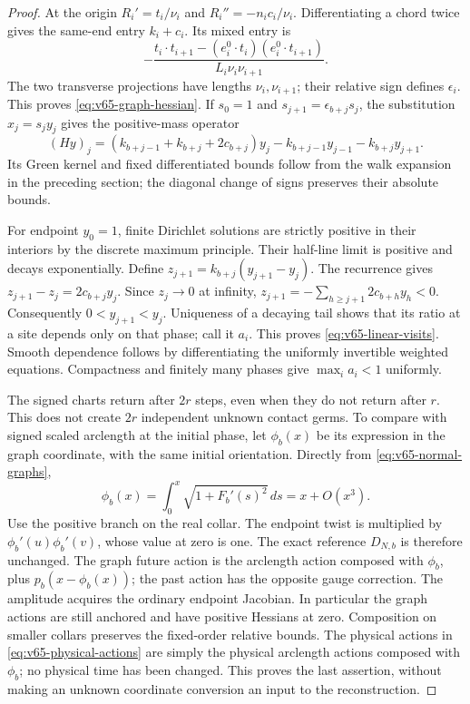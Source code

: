 \begin{proof}
At the origin $R_i'=t_i/\nu_i$ and $R_i''=-n_i c_i/\nu_i$.
Differentiating a chord twice gives the same-end entry $k_i+c_i$.
Its mixed entry is
\[
 -\frac{t_i\cdot t_{i+1}-(e_i^0\cdot t_i)
                (e_i^0\cdot t_{i+1})}{L_i\nu_i\nu_{i+1}}.
\]
The two transverse projections have lengths $\nu_i,\nu_{i+1}$;
their relative sign defines $\epsilon_i$.  This proves
\eqref{eq:v65-graph-hessian}.  If $s_0=1$ and
$s_{j+1}=\epsilon_{b+j}s_j$, the substitution $x_j=s_j y_j$
gives the positive-mass operator
\[
 (Hy)_j=(k_{b+j-1}+k_{b+j}+2c_{b+j})y_j
              -k_{b+j-1}y_{j-1}-k_{b+j}y_{j+1}.
\]
Its Green kernel and fixed differentiated bounds follow from the walk
expansion in the preceding section; the diagonal change of signs
preserves their absolute bounds.

For endpoint $y_0=1$, finite Dirichlet solutions are strictly positive
in their interiors by the discrete maximum principle.  Their half-line
limit is positive and decays exponentially.  Define
$z_{j+1}=k_{b+j}(y_{j+1}-y_j)$.  The recurrence gives
$z_{j+1}-z_j=2c_{b+j}y_j$.  Since $z_j\to0$ at infinity,
$z_{j+1}=-\sum_{h\ge j+1}2c_{b+h}y_h<0$.
Consequently $0<y_{j+1}<y_j$.  Uniqueness of a decaying tail shows
that its ratio at a site depends only on that phase; call it $a_i$.
This proves \eqref{eq:v65-linear-visits}.  Smooth dependence follows
by differentiating the uniformly invertible weighted equations.
Compactness and finitely many phases give $\max_i a_i<1$ uniformly.

The signed charts return after $2r$ steps, even when they do not return
after $r$.  This does not create $2r$ independent unknown contact germs.
To compare with signed scaled arclength at the initial phase, let
$\phi_b(x)$ be its expression in the graph coordinate, with the same
initial orientation.  Directly from \eqref{eq:v65-normal-graphs},
\[
 \phi_b(x)=\int_0^x\sqrt{1+F_b'(s)^2}\,ds
                  =x+O(x^3).
\]
Use the positive branch on the real collar.  The endpoint twist is
multiplied by $\phi_b'(u)\phi_b'(v)$, whose value at zero is one.
The exact reference $D_{N,b}$ is therefore unchanged.  The graph future
action is the arclength action composed with $\phi_b$, plus
$p_b(x-\phi_b(x))$; the past action has the opposite gauge correction.
The amplitude acquires the ordinary endpoint Jacobian.  In particular
the graph actions are still anchored and have positive Hessians at zero.
Composition on smaller collars preserves the fixed-order relative bounds.
The physical actions in \eqref{eq:v65-physical-actions} are simply the
physical arclength actions composed with $\phi_b$; no physical time
has been changed.  This proves the last assertion, without making an
unknown coordinate conversion an input to the reconstruction.
\end{proof}

